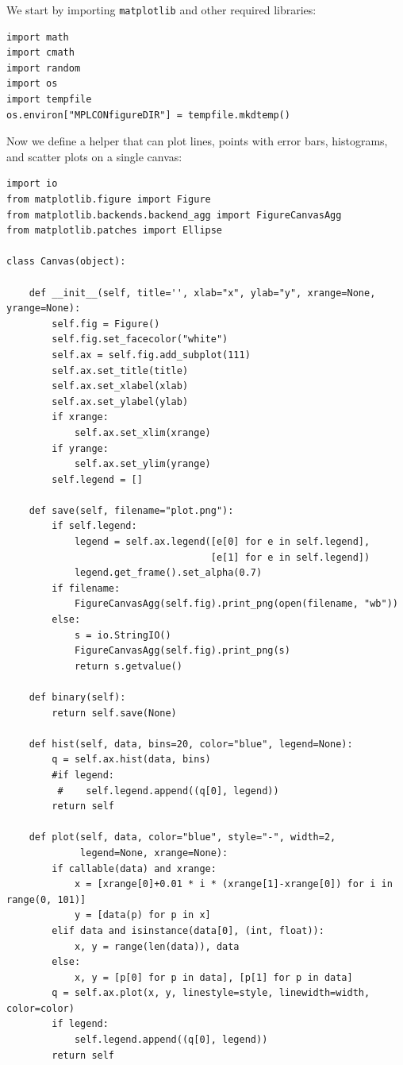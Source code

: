 \documentclass[justified, sixbynine]{tufte-book}
\def\ft{\small\tt}
\theoremstyle{plain}%
\newtheorem * {corollary}{Corollary}
\theoremstyle{definition}
\theoremstyle{remark}
\newtheorem * {remark}{Remark}
\newtheorem * {note}{Note}
\begin{document}
\begin{fullwidth}
We start by importing {\ft matplotlib} and other required libraries:

\begin{lstlisting}[caption={in file: {\ft nlib.py}}]
import math
import cmath
import random
import os
import tempfile
os.environ["MPLCONfigureDIR"] = tempfile.mkdtemp()
\end{lstlisting}

Now we define a helper that can plot lines, points with error bars, histograms, and scatter plots on a single canvas:


\begin{lstlisting}[caption={in file: {\ft nlib.py}}]
import io
from matplotlib.figure import Figure
from matplotlib.backends.backend_agg import FigureCanvasAgg
from matplotlib.patches import Ellipse

class Canvas(object):

    def __init__(self, title='', xlab="x", ylab="y", xrange=None, yrange=None):
        self.fig = Figure()
        self.fig.set_facecolor("white")
        self.ax = self.fig.add_subplot(111)
        self.ax.set_title(title)
        self.ax.set_xlabel(xlab)
        self.ax.set_ylabel(ylab)
        if xrange:
            self.ax.set_xlim(xrange)
        if yrange:
            self.ax.set_ylim(yrange)
        self.legend = []

    def save(self, filename="plot.png"):
        if self.legend:
            legend = self.ax.legend([e[0] for e in self.legend], 
                                    [e[1] for e in self.legend])
            legend.get_frame().set_alpha(0.7)
        if filename:
            FigureCanvasAgg(self.fig).print_png(open(filename, "wb"))
        else:
            s = io.StringIO()
            FigureCanvasAgg(self.fig).print_png(s)
            return s.getvalue()

    def binary(self):
        return self.save(None)

    def hist(self, data, bins=20, color="blue", legend=None):
        q = self.ax.hist(data, bins)
        #if legend:
         #    self.legend.append((q[0], legend))
        return self

    def plot(self, data, color="blue", style="-", width=2, 
             legend=None, xrange=None):
        if callable(data) and xrange:
            x = [xrange[0]+0.01 * i * (xrange[1]-xrange[0]) for i in range(0, 101)]
            y = [data(p) for p in x]
        elif data and isinstance(data[0], (int, float)):
            x, y = range(len(data)), data
        else:
            x, y = [p[0] for p in data], [p[1] for p in data]
        q = self.ax.plot(x, y, linestyle=style, linewidth=width, color=color)
        if legend:
            self.legend.append((q[0], legend))
        return self


\end{lstlisting}
\end{fullwidth}
\end{document}
